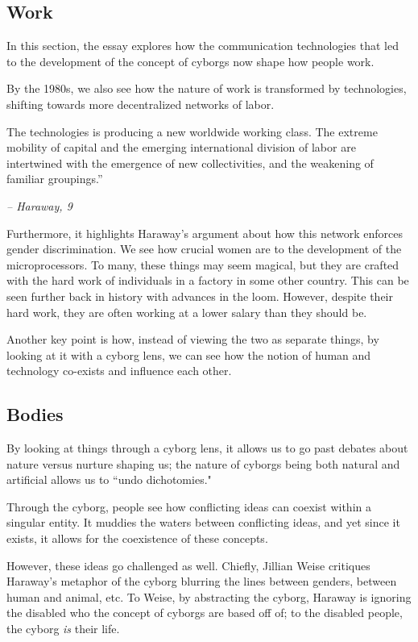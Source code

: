 \documentclass[openany]{book}
\begin{document}
\subsection{Work}
In this section, the essay explores how the communication technologies that led to the development of the concept of cyborgs now shape how people work.

By the 1980s, we also see how the nature of work is transformed by technologies, shifting towards more decentralized networks of labor.

\begin{fancyquotes}
	The technologies is producing a new worldwide
	working class. The extreme mobility of capital and the
	emerging international division of labor are intertwined
	with the emergence of new collectivities, and the weakening of familiar groupings.”
	
	\begin{flushright}
		\emph{\textit{-- Haraway, 9}}
	\end{flushright}
\end{fancyquotes}

Furthermore, it highlights Haraway's argument about how this network enforces gender discrimination. We see how crucial women are to the development of the microprocessors. To many, these things may seem magical, but they are crafted with the hard work of individuals in a factory in some other country. This can be seen further back in history with advances in the loom. However, despite their hard work, they are often working at a lower salary than they should be.

Another key point is how, instead of viewing the two as separate things, by looking at it with a cyborg lens, we can see how the notion of human and technology co-exists and influence each other. 

\subsection{Bodies}
By looking at things through a cyborg lens, it allows us to go past debates about nature versus nurture shaping us; the nature of cyborgs being both natural and artificial allows us to ``undo dichotomies."

Through the cyborg, people see how conflicting ideas can coexist within a singular entity. It muddies the waters between conflicting ideas, and yet since it exists, it allows for the coexistence of these concepts. 

However, these ideas go challenged as well. Chiefly, Jillian Weise critiques Haraway's metaphor of the cyborg blurring the lines between genders, between human and animal, etc. To Weise, by abstracting the cyborg, Haraway is ignoring the disabled who the concept of cyborgs are based off of; to the disabled people, the cyborg \textit{is} their life.
\end{document}
